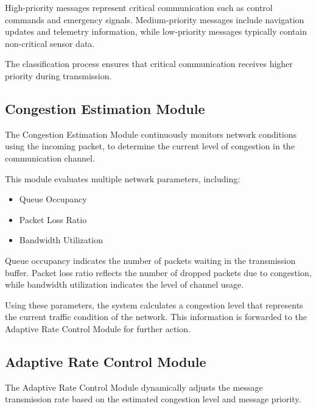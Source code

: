 High-priority messages represent critical communication such as 
control commands and emergency signals. Medium-priority messages 
include navigation updates and telemetry information, while 
low-priority messages typically contain non-critical sensor data.

The classification process ensures that critical communication 
receives higher priority during transmission.


\subsection{Congestion Estimation Module}

The Congestion Estimation Module continuously monitors network 
conditions using the incoming packet, to determine the current level of congestion in the 
communication channel.

This module evaluates multiple network parameters, including:

\begin{itemize}

\item Queue Occupancy

\item Packet Loss Ratio

\item Bandwidth Utilization

\end{itemize}

Queue occupancy indicates the number of packets waiting in the 
transmission buffer. Packet loss ratio reflects the number of 
dropped packets due to congestion, while bandwidth utilization 
indicates the level of channel usage.

Using these parameters, the system calculates a congestion level 
that represents the current traffic condition of the network. 
This information is forwarded to the Adaptive Rate Control Module 
for further action.


\subsection{Adaptive Rate Control Module}

The Adaptive Rate Control Module dynamically adjusts the message 
transmission rate based on the estimated congestion level and 
message priority.

